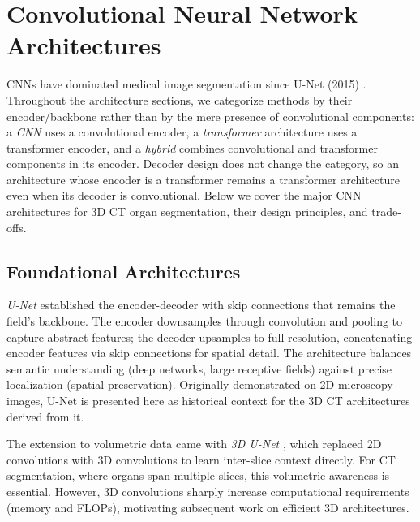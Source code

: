 \FloatBarrier

\section{Convolutional Neural Network Architectures}
\label{sec:convolutional}

CNNs have dominated medical image segmentation since U-Net (2015) \cite{ronneberger2015unet}. Throughout the architecture sections, we categorize methods by their encoder/backbone rather than by the mere presence of convolutional components: a \emph{CNN} uses a convolutional encoder, a \emph{transformer} architecture uses a transformer encoder, and a \emph{hybrid} combines convolutional and transformer components in its encoder. Decoder design does not change the category, so an architecture whose encoder is a transformer remains a transformer architecture even when its decoder is convolutional. Below we cover the major CNN architectures for 3D CT organ segmentation, their design principles, and trade-offs.

\subsection{Foundational Architectures}

\emph{U-Net} \cite{ronneberger2015unet} established the encoder-decoder with skip connections that remains the field's backbone. The encoder downsamples through convolution and pooling to capture abstract features; the decoder upsamples to full resolution, concatenating encoder features via skip connections for spatial detail. The architecture balances semantic understanding (deep networks, large receptive fields) against precise localization (spatial preservation). Originally demonstrated on 2D microscopy images, U-Net is presented here as historical context for the 3D CT architectures derived from it.

The extension to volumetric data came with \emph{3D U-Net} \cite{cicek20163dunet}, which replaced 2D convolutions with 3D convolutions to learn inter-slice context directly. For CT segmentation, where organs span multiple slices, this volumetric awareness is essential. However, 3D convolutions sharply increase computational requirements (memory and FLOPs), motivating subsequent work on efficient 3D architectures.

